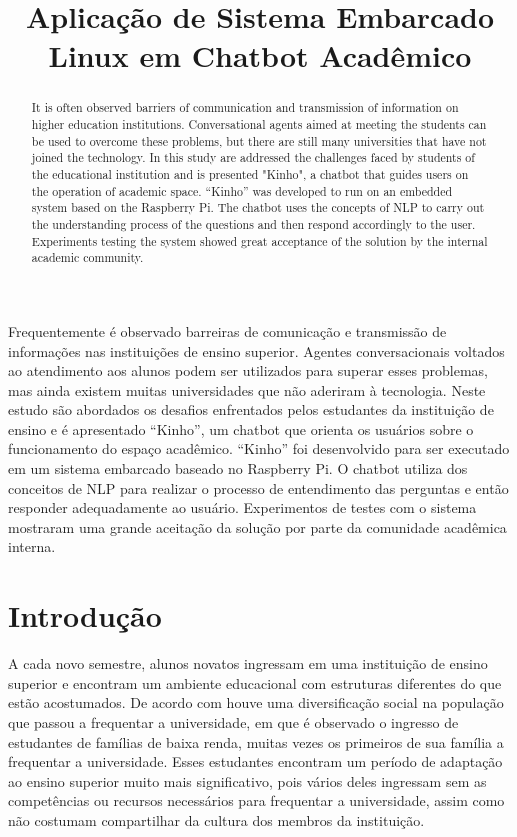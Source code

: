 \documentclass[12pt]{article}
\title{Aplicação de Sistema Embarcado Linux em Chatbot Acadêmico}
\begin{document}
 

\maketitle

\begin{abstract}
It is often observed barriers of communication and transmission of information on higher education institutions. Conversational agents aimed at meeting the students can be used to overcome these problems, but there are still many universities that have not joined the technology. In this study are addressed the challenges faced by students of the educational institution and is presented "Kinho", a chatbot that guides users on the operation of academic space. “Kinho” was developed to run on an embedded system based on the Raspberry Pi. The chatbot uses the concepts of NLP to carry out the understanding process of the questions and then respond accordingly to the user. Experiments testing the system showed great acceptance of the solution by the internal academic community.
\end{abstract}
     
\begin{resumo} 
Frequentemente é observado barreiras de comunicação e transmissão de informações nas instituições de ensino superior. Agentes conversacionais voltados ao atendimento aos alunos podem ser utilizados para superar esses problemas, mas ainda existem muitas universidades que não aderiram à tecnologia. Neste estudo são abordados os desafios enfrentados pelos estudantes da instituição de ensino e é apresentado “Kinho”, um chatbot que orienta os usuários sobre o funcionamento do espaço acadêmico. “Kinho” foi desenvolvido para ser executado em um sistema embarcado baseado no Raspberry Pi. O chatbot utiliza dos conceitos de NLP para realizar  o processo de entendimento das perguntas e então responder adequadamente ao usuário. Experimentos de testes com o sistema mostraram uma grande aceitação da solução por parte da comunidade acadêmica interna.
\end{resumo}


\section{Introdução}

A cada novo semestre, alunos novatos ingressam em uma instituição de ensino superior e encontram um ambiente educacional com estruturas diferentes do que estão acostumados. De acordo com \cite{torres:21} houve uma diversificação social na população que passou a frequentar a universidade, em que é observado o ingresso de estudantes de famílias de baixa renda, muitas vezes os primeiros de sua família a frequentar a universidade. Esses estudantes encontram um período de adaptação ao ensino superior muito mais significativo, pois vários deles ingressam sem as competências ou recursos necessários para frequentar a universidade, assim como não costumam compartilhar da cultura dos membros da instituição. 
\end{document}
